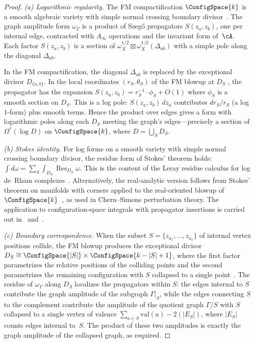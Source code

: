\begin{proof}
\emph{(a) Logarithmic regularity.}
The FM compactification $\ConfigSpace{k}$ is a smooth algebraic
variety with simple normal crossing boundary
divisor~\cite{FM94}.  The graph amplitude form $\omega_\Gamma$ is a
product of Szeg\H{o} propagators $S(z_a, z_b)$, one per internal
edge, contracted with $A_\infty$ operations and the invariant form
of~$\cA$.  Each factor $S(z_a, z_b)$ is a section of
$\omega_X^{1/2} \boxtimes \omega_X^{1/2}(\Delta_{ab})$
with a simple pole along the diagonal $\Delta_{ab}$.

In the FM compactification, the diagonal $\Delta_{ab}$ is replaced
by the exceptional divisor $D_{\{a,b\}}$.  In the local coordinates
$(r_S, \theta_S)$ of the FM blowup at $D_S$
\cite[§2]{FM94}, the propagator has the expansion
$S(z_a, z_b) = r_S^{-1} \cdot \phi_S + O(1)$ where $\phi_S$ is a
smooth section on $D_S$.  This is a log pole:
$S(z_a,z_b) \, dz_a$ contributes $dr_S/r_S$ (a log
$1$-form) plus smooth terms.  Hence the product over edges gives a
form with logarithmic poles along each $D_S$ meeting the graph's
edges---precisely a section of $\Omega^*(\log D)$ on
$\ConfigSpace{k}$, where $D = \bigcup_S D_S$.

\emph{(b) Stokes identity.}
For log forms on a smooth variety with simple normal crossing
boundary divisor, the residue form of Stokes' theorem holds:
$\int d\omega = \sum_S \int_{D_S} \operatorname{Res}_{D_S} \omega$.
This is the content of the Leray residue calculus for log de~Rham
complexes~\cite{Deligne70}.  Alternatively, the real-analytic
version follows from Stokes' theorem on manifolds with corners
applied to the real-oriented blowup of
$\ConfigSpace{k}$~\cite{AS94}, as used in Chern--Simons
perturbation theory.  The application to configuration-space
integrals with propagator insertions is carried out
in~\cite{Kon03} and~\cite{costello-renormalization}.

\emph{(c) Boundary correspondence.}
When the subset $S = \{z_{a_1}, \ldots, z_{a_s}\}$ of internal
vertex positions collide, the FM blowup produces the exceptional
divisor $D_S \cong \ConfigSpace{|S|} \times \ConfigSpace{k-|S|+1}$,
where the first factor parametrizes the relative positions of the
colliding points and the second parametrizes the remaining
configuration with $S$ collapsed to a single point~\cite[§3]{FM94}.
The residue of $\omega_\Gamma$ along $D_S$ localizes the
propagators within $S$: the edges internal to $S$ contribute the
graph amplitude of the subgraph $\Gamma|_S$, while the edges
connecting $S$ to the complement contribute the amplitude of the
quotient graph $\Gamma/S$ with $S$ collapsed to a single vertex
of valence $\sum_{a \in S} \mathrm{val}(a) - 2(|E_S|)$, where
$|E_S|$ counts edges internal to~$S$.  The product of these two
amplitudes is exactly the graph amplitude of the collapsed graph,
as required.
\end{proof}

